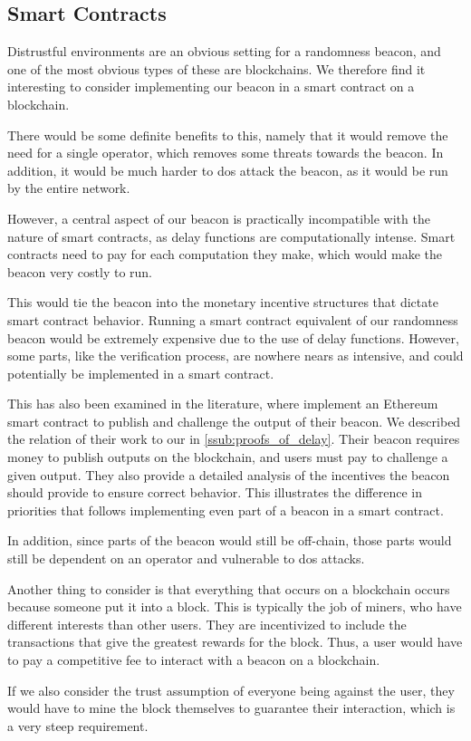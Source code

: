 \subsection{Smart Contracts}
Distrustful environments are an obvious setting for a randomness beacon, and one of the most obvious types of these are blockchains.
We therefore find it interesting to consider implementing our beacon in a smart contract on a blockchain.

There would be some definite benefits to this, namely that it would remove the need for a single operator, which removes some threats towards the beacon.
In addition, it would be much harder to \acrshort{dos} attack the beacon, as it would be run by the entire network.

However, a central aspect of our beacon is practically incompatible with the nature of smart contracts, as delay functions are computationally intense.
Smart contracts need to pay for each computation they make, which would make the beacon very costly to run.

This would tie the beacon into the monetary incentive structures that dictate smart contract behavior.
Running a smart contract equivalent of our randomness beacon would be extremely expensive due to the use of delay functions.
However, some parts, like the verification process, are nowhere nears as intensive, and could potentially be implemented in a smart contract.

This has also been examined in the literature, where \citet{bunz2017proofsof} implement an Ethereum smart contract to publish and challenge the output of their beacon.
We described the relation of their work to our in \vref{ssub:proofs_of_delay}.
Their beacon requires money to publish outputs on the blockchain, and users must pay to challenge a given output.
They also provide a detailed analysis of the incentives the beacon should provide to ensure correct behavior.
This illustrates the difference in priorities that follows implementing even part of a beacon in a smart contract.

In addition, since parts of the beacon would still be off-chain, those parts would still be dependent on an operator and vulnerable to \acrshort{dos} attacks.

Another thing to consider is that everything that occurs on a blockchain occurs because someone put it into a block.
This is typically the job of miners, who have different interests than other users.
They are incentivized to include the transactions that give the greatest rewards for the block.
Thus, a user would have to pay a competitive fee to interact with a beacon on a blockchain.

If we also consider the trust assumption of everyone being against the user, they would have to mine the block themselves to guarantee their interaction, which is a very steep requirement.

